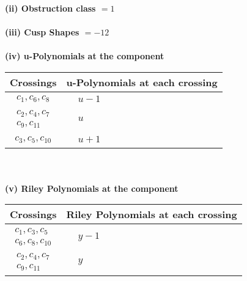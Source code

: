 \documentclass[1p]{elsarticle_modified}
\theoremstyle{definition}
\begin{document}
\flushleft \textbf{(ii) Obstruction class $= 1$}\\~\\
\flushleft \textbf{(iii) Cusp Shapes $= -12$}\\~\\
\newpage\renewcommand{\arraystretch}{1}
\flushleft \textbf{(iv) u-Polynomials at the component}\newline \\
\begin{tabular}{m{50pt}|m{274pt}}
Crossings & \hspace{64pt}u-Polynomials at each crossing \\
\hline $$\begin{aligned}c_{1},c_{6},c_{8}\end{aligned}$$&$\begin{aligned}
&u-1
\end{aligned}$\\
\hline $$\begin{aligned}c_{2},c_{4},c_{7}\\c_{9},c_{11}\end{aligned}$$&$\begin{aligned}
&u
\end{aligned}$\\
\hline $$\begin{aligned}c_{3},c_{5},c_{10}\end{aligned}$$&$\begin{aligned}
&u+1
\end{aligned}$\\
\hline
\end{tabular}\\~\\
\newpage\renewcommand{\arraystretch}{1}
\flushleft \textbf{(v) Riley Polynomials at the component}\newline \\
\begin{tabular}{m{50pt}|m{274pt}}
Crossings & \hspace{64pt}Riley Polynomials at each crossing \\
\hline $$\begin{aligned}c_{1},c_{3},c_{5}\\c_{6},c_{8},c_{10}\end{aligned}$$&$\begin{aligned}
&y-1
\end{aligned}$\\
\hline $$\begin{aligned}c_{2},c_{4},c_{7}\\c_{9},c_{11}\end{aligned}$$&$\begin{aligned}
&y
\end{aligned}$\\
\hline
\end{tabular}\\~\\
\end{document}
